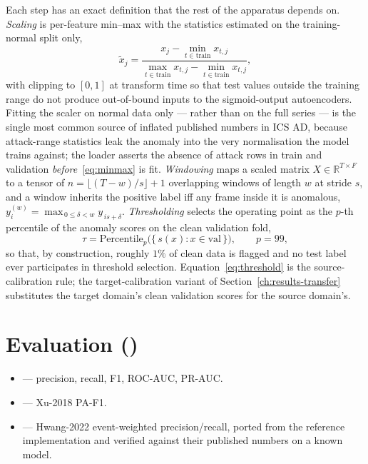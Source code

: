 Each step has an exact definition that the rest of the apparatus depends on.  \emph{Scaling} is per-feature min--max with the statistics estimated on the training-normal split only,
\begin{equation}
  \tilde{x}_j = \frac{x_j - \min_{t \in \mathrm{train}} x_{t,j}}{\max_{t \in \mathrm{train}} x_{t,j} - \min_{t \in \mathrm{train}} x_{t,j}},
  \label{eq:minmax}
\end{equation}
with clipping to $[0,1]$ at transform time so that test values outside the training range do not produce out-of-bound inputs to the sigmoid-output autoencoders.  Fitting the scaler on normal data only --- rather than on the full series --- is the single most common source of inflated published numbers in ICS AD, because attack-range statistics leak the anomaly into the very normalisation the model trains against; the loader asserts the absence of attack rows in train and validation \emph{before}~\eqref{eq:minmax} is fit.  \emph{Windowing} maps a scaled matrix $X \in \mathbb{R}^{T \times F}$ to a tensor of $n = \lfloor (T - w)/s \rfloor + 1$ overlapping windows of length $w$ at stride $s$, and a window inherits the positive label iff any frame inside it is anomalous, $y^{(w)}_i = \max_{\,0 \leq \delta < w} y_{\,i s + \delta}$.  \emph{Thresholding} selects the operating point as the $p$-th percentile of the anomaly scores on the clean validation fold,
\begin{equation}
  \tau = \mathrm{Percentile}_{p}\bigl(\{\, s(x) : x \in \mathrm{val} \,\}\bigr), \qquad p = 99,
  \label{eq:threshold}
\end{equation}
so that, by construction, roughly $1\%$ of clean data is flagged and no test label ever participates in threshold selection.  Equation~\eqref{eq:threshold} is the source-calibration rule; the target-calibration variant of Section~\ref{ch:results-transfer} substitutes the target domain's clean validation scores for the source domain's.

\section{Evaluation ()}

\begin{itemize}
  \item {} --- precision, recall, F1, ROC-AUC, PR-AUC.
  \item {} --- Xu-2018 PA-F1.
  \item {} --- Hwang-2022 event-weighted precision/recall, ported from the reference implementation and verified against their published numbers on a known model.
\end{itemize}

